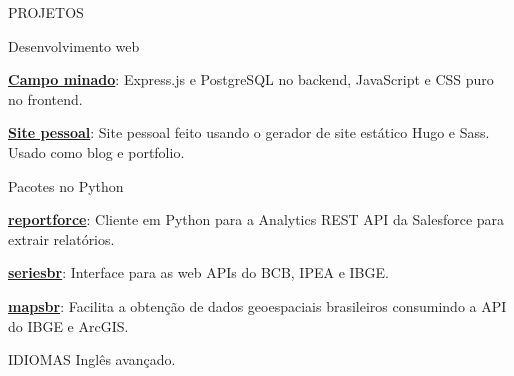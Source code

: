 \documentclass{resume}
\begin{document}
\begin{rSection}{PROJETOS}

  \begin{rSubsection}{Desenvolvimento web}{}{}
  \item
  \item \href{https://github.com/phelipetls/minesweeper.js}{\textbf{Campo
        minado}}: Express.js e PostgreSQL no backend, JavaScript e CSS puro no
        frontend.
  \item \href{https://phelipetls.github.io}{\textbf{Site pessoal}}: Site pessoal
        feito usando o gerador de site estático Hugo e Sass. Usado como blog e
        portfolio.
  \vspace{5mm}
  \end{rSubsection}

  \begin{rSubsection}{Pacotes no Python}{}{}
  \item
  \item \href{https://github.com/phelipetls/reportforce}{\textbf{reportforce}}:
        Cliente em Python para a Analytics REST API da Salesforce para
        extrair relatórios.
  \item \href{https://github.com/phelipetls/seriesbr}{\textbf{seriesbr}}:
        Interface para as web APIs do BCB, IPEA e IBGE.
  \item \href{https://github.com/phelipetls/mapsbr}{\textbf{mapsbr}}:
        Facilita a obtenção de dados geoespaciais brasileiros consumindo a
        API do  IBGE e ArcGIS.
  \vspace{5mm}
  \end{rSubsection}

\end{rSection}


\begin{rSection}{IDIOMAS} \itemsep -3pt
    {Inglês avançado.}
\end{rSection}
\end{document}
